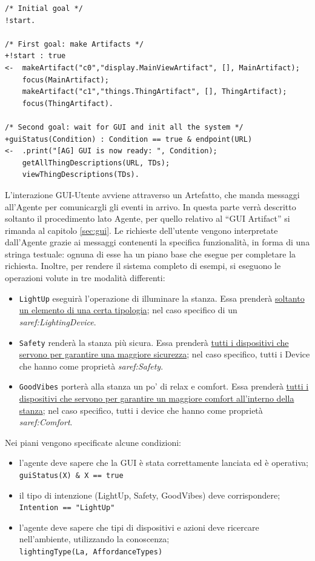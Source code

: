 \documentclass[12pt,a4paper,openright,oneside]{report}
\newcommand{\quotes}[1]{``#1''}
\begin{document}
\begin{lstlisting}
/* Initial goal */
!start.

/* First goal: make Artifacts */
+!start : true
<-  makeArtifact("c0","display.MainViewArtifact", [], MainArtifact);
	focus(MainArtifact);
	makeArtifact("c1","things.ThingArtifact", [], ThingArtifact);
	focus(ThingArtifact).

/* Second goal: wait for GUI and init all the system */
+guiStatus(Condition) : Condition == true & endpoint(URL)
<-  .print("[AG] GUI is now ready: ", Condition);
	getAllThingDescriptions(URL, TDs);
	viewThingDescriptions(TDs).
\end{lstlisting}

L'interazione GUI-Utente avviene attraverso un Artefatto, che manda messaggi all'Agente per comunicargli gli eventi in arrivo. In questa parte verrà descritto soltanto il procedimento lato Agente, per quello relativo al \quotes{GUI Artifact} si rimanda al capitolo \ref{sec:gui}. Le richieste dell'utente vengono interpretate dall'Agente grazie ai messaggi contenenti la specifica funzionalità, in forma di una stringa testuale: ognuna di esse ha un piano base che esegue per completare la richiesta. Inoltre, per rendere il sistema completo di esempi, si eseguono le operazioni volute in tre modalità differenti:

\begin{itemize}
	\itemsep0em 
	\item \texttt{LightUp} eseguirà l'operazione di illuminare la stanza. Essa prenderà \ul{soltanto un elemento di una certa tipologia}; nel caso specifico di un \textit{saref:LightingDevice}.
	\item \texttt{Safety} renderà la stanza più sicura. Essa prenderà \ul{tutti i dispositivi che servono per garantire una maggiore sicurezza}; nel caso specifico, tutti i Device che hanno come proprietà \textit{saref:Safety}.
	\item \texttt{GoodVibes} porterà alla stanza un po' di relax e comfort. Essa prenderà \ul{tutti i dispositivi che servono per garantire un maggiore comfort all'interno della stanza}; nel caso specifico, tutti i device che hanno come proprietà \textit{saref:Comfort}.
\end{itemize}

Nei piani vengono specificate alcune condizioni:
\begin{itemize}
	\item l'agente deve sapere che la GUI è stata correttamente lanciata ed è operativa;\\
	\texttt{guiStatus(X) \& X == true}
	
	\item il tipo di intenzione (LightUp, Safety, GoodVibes) deve corrispondere;\\
	\texttt{Intention == "LightUp"}
	
	\item l'agente deve sapere che tipi di dispositivi e azioni deve ricercare nell'ambiente, utilizzando la conoscenza;\\
	\texttt{lightingType(La, AffordanceTypes)}
\end{itemize}
\end{document}
